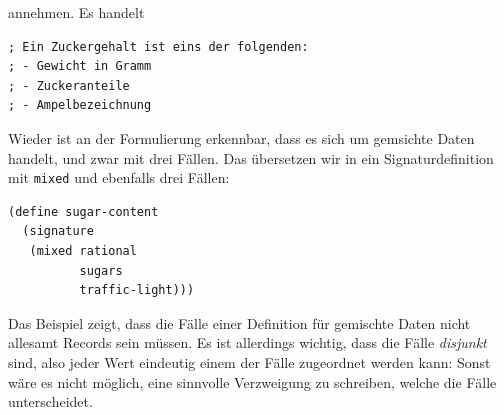 annehmen.  Es handelt 
%
\begin{verbatim}
; Ein Zuckergehalt ist eins der folgenden:
; - Gewicht in Gramm
; - Zuckeranteile
; - Ampelbezeichnung
\end{verbatim}
%
Wieder ist an der Formulierung erkennbar, dass es sich um gemsichte
Daten handelt, und zwar mit drei Fällen.  Das übersetzen wir in ein
Signaturdefinition mit \texttt{mixed} und ebenfalls drei Fällen:
%
\begin{verbatim}
(define sugar-content
  (signature
   (mixed rational
          sugars
          traffic-light)))
\end{verbatim}
%
Das Beispiel zeigt, dass die Fälle einer Definition für gemischte Daten
nicht allesamt Records sein müssen.  Es ist allerdings wichtig, dass
die Fälle \emph{disjunkt} sind, also jeder Wert eindeutig einem der
Fälle zugeordnet werden kann: Sonst wäre es nicht möglich, eine sinnvolle
Verzweigung zu schreiben, welche die Fälle unterscheidet.

